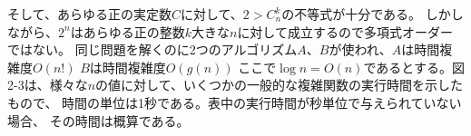 
そして、あらゆる正の実定数$C$に対して、$2>C_n^k$の不等式が十分である。
しかしながら、$2^n$はあらゆる正の整数$k$大きな$n$に対して成立するので多項式オーダーではない。
同じ問題を解くのに2つのアルゴリズム$A$、$B$が使われ、$A$は時間複雑度$O(n!)$ $B$は時間複雑度$O(g(n))$
ここで$\log n = O(n)$であるとする。図2-3は、様々な$n$の値に対して、いくつかの一般的な複雑関数の実行時間を示したもので、
時間の単位は1秒である。表中の実行時間が秒単位で与えられていない場合、
その時間は概算である。